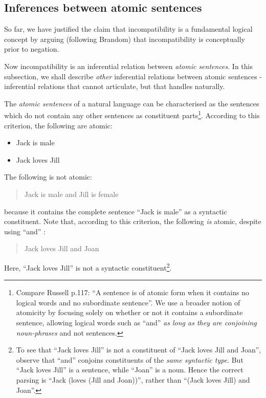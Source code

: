 \subsection{Inferences between atomic sentences}
\label{intrasentential}
So far, we have justified the claim that incompatibility is a fundamental logical concept by arguing (following Brandom) that incompatibility is conceptually prior to negation. 

Now incompatibility is an inferential relation between \emph{atomic sentences}. 
In this subsection, we shall describe \emph{other} inferential relations between atomic sentences - inferential relations that \fol{} cannot articulate, but that \cathoristic{} handles naturally.

The \emph{atomic sentences} of a natural language can be
characterised as the sentences which do not contain any other
sentences as constituent parts\footnote{Compare Russell \cite{russell}
  p.117: ``A sentence is of atomic form when it contains no logical
  words and no subordinate sentence''. We use a broader notion of
  atomicity by focusing solely on whether or not it contains a
  subordinate sentence, allowing logical words such as ``and'' \emph{as long
  as they are conjoining noun-phrases} and not sentences.}.  According
to this criterion, the following are atomic:

\begin{itemize}

\item Jack is male
\item Jack loves Jill
\end{itemize}

\NI The following is not atomic:

\begin{quote}
  Jack is male and Jill is female
\end{quote}

\NI because it contains the complete sentence ``Jack is male'' as a
syntactic constituent.  Note that, according to this criterion, the
following \emph{is} atomic, despite using ``and'' :

\begin{quote}
  Jack loves Jill and Joan
\end{quote}

\NI Here, ``Jack loves Jill'' is not a syntactic constituent\footnote{To see that ``Jack loves Jill'' is not a constituent of ``Jack loves Jill and Joan'', observe that ``and'' conjoins constituents of the \emph{same syntactic type}. But ``Jack loves Jill'' is a sentence, while ``Joan'' is a noun. Hence the correct parsing is ``Jack (loves (Jill and Joan))'', rather than ``(Jack loves Jill) and Joan''.}.


